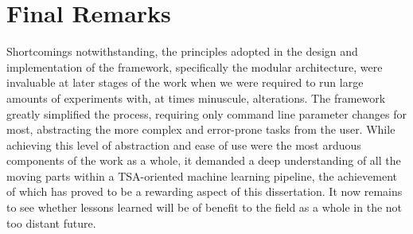 \documentclass[../../fyp.tex]{subfiles}
\begin{document}
\section{Final Remarks}
Shortcomings notwithstanding, the principles adopted in the design and implementation of the framework, specifically the modular architecture, were invaluable at later stages of the work when we were required to run large amounts of experiments with, at times minuscule, alterations. The framework greatly simplified the process, requiring only command line parameter changes for most, abstracting the more complex and error-prone tasks from the user. While achieving this level of abstraction and ease of use were the most arduous components of the work as a whole, it demanded a deep understanding of all the moving parts within a TSA-oriented machine learning pipeline, the achievement of which has proved to be a rewarding aspect of this dissertation. It now remains to see whether lessons learned will be of benefit to the field as a whole in the not too distant future.

% 

% 
\end{document}
